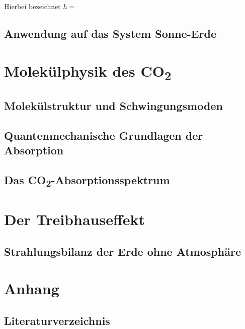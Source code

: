 \documentclass[12pt,a4paper]{article}
\begin{document}
Hierbei bezeichnet $h = $


\subsection{Anwendung auf das System Sonne-Erde}

\section{Molekülphysik des CO\textsubscript{2}}

\subsection{Molekülstruktur und Schwingungsmoden}

\subsection{Quantenmechanische Grundlagen der Absorption}

\subsection{Das CO\textsubscript{2}-Absorptionsspektrum}

\section{Der Treibhauseffekt}

\subsection{Strahlungsbilanz der Erde ohne Atmosphäre}

\newpage
\section{Anhang}

\subsection{Literaturverzeichnis}
\printbibliography[heading=none]

\end{document}
